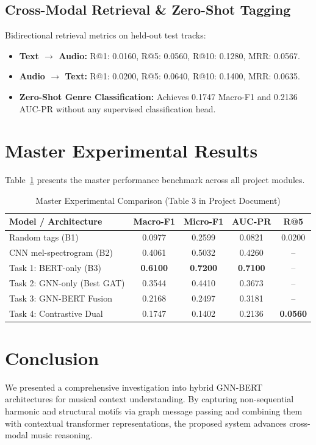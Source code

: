 \documentclass[conference]{IEEEtran}
\begin{document}
\subsection{Cross-Modal Retrieval \& Zero-Shot Tagging}
Bidirectional retrieval metrics on held-out test tracks:
\begin{itemize}
    \item \textbf{Text $\to$ Audio:} R@1: 0.0160, R@5: 0.0560, R@10: 0.1280, MRR: 0.0567.
    \item \textbf{Audio $\to$ Text:} R@1: 0.0200, R@5: 0.0640, R@10: 0.1400, MRR: 0.0635.
    \item \textbf{Zero-Shot Genre Classification:} Achieves 0.1747 Macro-F1 and 0.2136 AUC-PR without any supervised classification head.
\end{itemize}

\section{Master Experimental Results}
Table~\ref{tab:master} presents the master performance benchmark across all project modules.

\begin{table}[htbp]
\caption{Master Experimental Comparison (Table 3 in Project Document)}
\begin{center}
\begin{tabular}{lcccc}
\toprule
\textbf{Model / Architecture} & \textbf{Macro-F1} & \textbf{Micro-F1} & \textbf{AUC-PR} & \textbf{R@5} \\
\midrule
Random tags (B1) & 0.0977 & 0.2599 & 0.0821 & 0.0200 \\
CNN mel-spectrogram (B2) & 0.4061 & 0.5032 & 0.4260 & -- \\
Task 1: BERT-only (B3) & \textbf{0.6100} & \textbf{0.7200} & \textbf{0.7100} & -- \\
Task 2: GNN-only (Best GAT) & 0.3544 & 0.4410 & 0.3673 & -- \\
Task 3: GNN-BERT Fusion & 0.2168 & 0.2497 & 0.3181 & -- \\
Task 4: Contrastive Dual & 0.1747 & 0.1402 & 0.2136 & \textbf{0.0560} \\
\bottomrule
\end{tabular}
\label{tab:master}
\end{center}
\end{table}

\section{Conclusion}
We presented a comprehensive investigation into hybrid GNN-BERT architectures for musical context understanding. By capturing non-sequential harmonic and structural motifs via graph message passing and combining them with contextual transformer representations, the proposed system advances cross-modal music reasoning.
\end{document}

